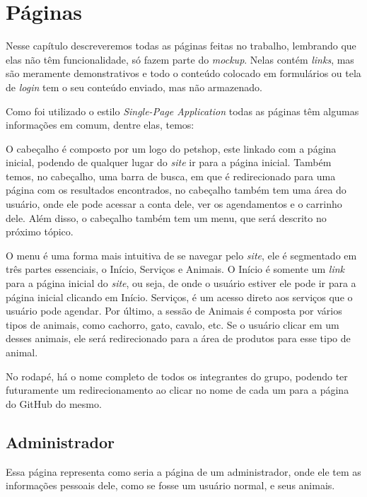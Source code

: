 \chapter{Páginas}
Nesse capítulo descreveremos todas as páginas feitas no trabalho, lembrando
que elas não têm funcionalidade, só fazem parte do \emph{mockup}. Nelas contém
\emph{links}, mas são meramente demonstrativos e todo o conteúdo colocado em
formulários ou tela de \emph{login} tem o seu conteúdo enviado, mas não
armazenado.

Como foi utilizado o estilo \emph{Single-Page Application} todas as páginas têm
algumas informações em comum, dentre elas, temos:
\begin{description}[style=nextline]
	\item [Cabeçalho]	O cabeçalho é composto por um logo do petshop, este linkado
						com a página inicial, podendo de qualquer lugar do \emph{site} ir
						para a página inicial. Também temos, no cabeçalho, uma barra
						de busca, em que é redirecionado para uma página com os
						resultados encontrados, no cabeçalho também tem uma área
						do usuário, onde ele pode acessar a conta dele, ver os
						agendamentos e o carrinho dele. Além disso, o cabeçalho
						também tem um menu, que será descrito no próximo tópico.
	\item [Menu]		O menu é uma forma mais intuitiva de se navegar pelo \emph{site},
						ele é segmentado em três partes essenciais, o Início,
						Serviços e Animais. O Início é somente um \emph{link} para
						a página inicial do \emph{site}, ou seja, de onde o usuário estiver
						ele pode ir para a página inicial clicando em Início.
						Serviços, é um acesso direto aos serviços que o usuário pode
						agendar. Por último, a sessão de Animais é composta por
						vários tipos de animais, como cachorro, gato, cavalo, etc.
						Se o usuário clicar em um desses animais, ele será
						redirecionado para a área de produtos para esse tipo de animal.
	\item [Rodapé]		No rodapé, há o nome completo de todos os integrantes do grupo,
						podendo ter futuramente um redirecionamento ao clicar no nome
						de cada um para a página do	GitHub do mesmo.
\end{description}

\section{Administrador}
Essa página representa como seria a página de um administrador, onde ele tem
as informações pessoais dele, como se fosse um usuário normal, e seus animais.

